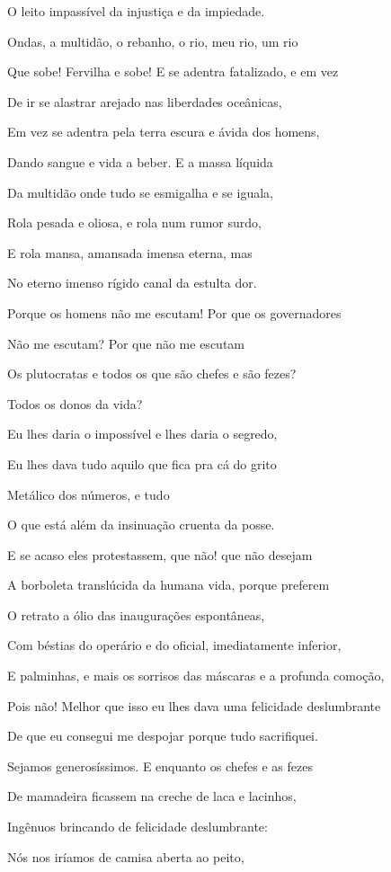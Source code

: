 O leito impassível da injustiça e da impiedade.

Ondas, a multidão, o rebanho, o rio, meu rio, um rio

Que sobe! Fervilha e sobe! E se adentra fatalizado, e em vez

De ir se alastrar arejado nas liberdades oceânicas,

Em vez se adentra pela terra escura e ávida dos homens,

Dando sangue e vida a beber. E a massa líquida

Da multidão onde tudo se esmigalha e se iguala,

Rola pesada e oliosa, e rola num rumor surdo,

E rola mansa, amansada imensa eterna, mas

No eterno imenso rígido canal da estulta dor.

Porque os homens não me escutam! Por que os governadores

Não me escutam? Por que não me escutam

Os plutocratas e todos os que são chefes e são fezes?

Todos os donos da vida?

Eu lhes daria o impossível e lhes daria o segredo,

Eu lhes dava tudo aquilo que fica pra cá do grito

Metálico dos números, e tudo

O que está além da insinuação cruenta da posse.

E se acaso eles protestassem, que não! que não desejam

A borboleta translúcida da humana vida, porque preferem

O retrato a ólio das inaugurações espontâneas,

Com béstias do operário e do oficial, imediatamente inferior,

E palminhas, e mais os sorrisos das máscaras e a profunda comoção,

Pois não! Melhor que isso eu lhes dava uma felicidade deslumbrante

De que eu consegui me despojar porque tudo sacrifiquei.

Sejamos generosíssimos. E enquanto os chefes e as fezes

De mamadeira ficassem na creche de laca e lacinhos,

Ingênuos brincando de felicidade deslumbrante:

Nós nos iríamos de camisa aberta ao peito,

